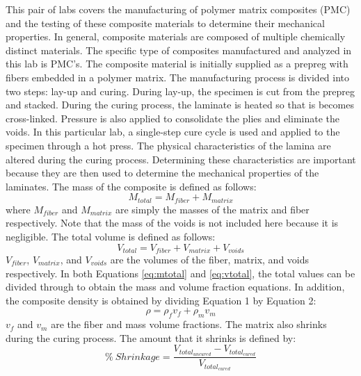 This pair of labs covers the manufacturing of polymer matrix composites (PMC) and the testing of these composite materials to determine their mechanical properties. In general, composite materials are composed of multiple chemically distinct materials. The specific type of composites manufactured and analyzed in this lab is PMC's. The composite material is initially supplied as a prepreg with fibers embedded in a polymer matrix. The manufacturing process is divided into two steps: lay-up and curing. During lay-up, the specimen is cut from the prepreg and stacked. During the curing process, the laminate is heated so that is becomes cross-linked. Pressure is also applied to consolidate the plies and eliminate the voids. In this particular lab, a single-step cure cycle is used and applied to the specimen through a hot press. The physical characteristics of the lamina are altered during the curing process. Determining these characteristics are important because they are then used to determine the mechanical properties of the laminates. The mass of the composite is defined as follows:
\begin{equation}
    M_{total} = M_{fiber} + M_{matrix}
    \label{eq:mtotal}
\end{equation}
where $M_{fiber}$ and $M_{matrix}$ are simply the masses of the matrix and fiber respectively. Note that the mass of the voids is not included here because it is negligible. The total volume is defined as follows:
\begin{equation}
    V_{total} =  V_{fiber} + V_{matrix} + V_{voids}
    \label{eq:vtotal}
\end{equation}
$V_{fiber}$, $V_{matrix}$, and $V_{voids}$ are the volumes of the fiber, matrix, and voids respectively. In both Equations \ref{eq:mtotal} and \ref{eq:vtotal}, the total values can be divided through to obtain the mass and volume fraction equations. In addition, the composite density is obtained by dividing Equation 1 by Equation 2:
\begin{equation}
    \rho =  \rho_{f}v_f + \rho_{m}v_{m}
    \label{eq:density}
\end{equation}
$v_f$ and $v_m$ are the fiber and mass volume fractions. The matrix also shrinks during the curing process. The amount that it shrinks is defined by:
\begin{equation}
    \%\ Shrinkage = \frac{V_{total_{uncured}} - V_{total_{cured}}}{V_{total_{cured}}}
\end{equation}

